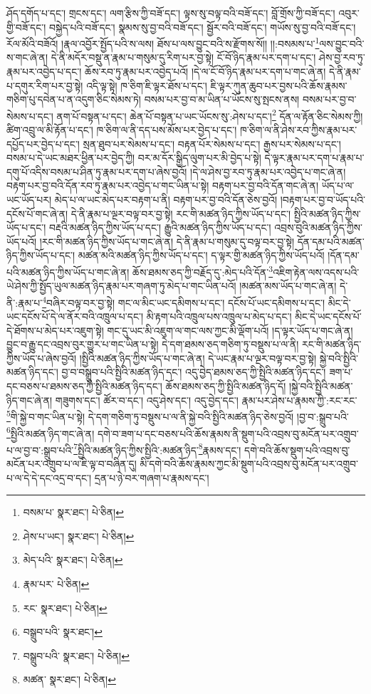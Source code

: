 ཤོད་དགོད་པ་དང་། གྲངས་དང་། ལག་རྩིས་ཀྱི་བཟོ་དང་། ལྟས་སུ་བལྟ་བའི་བཟོ་དང་། བློ་གྲོས་ཀྱི་བཟོ་དང་། འབུར་གྱི་བཟོ་དང་། བསྐྱེད་པའི་བཟོ་དང་། སྣམས་སུ་བྱ་བའི་བཟོ་དང་། སྦྱོར་བའི་བཟོ་དང་། གཡོས་སུ་བྱ་བའི་བཟོ་དང་། རོལ་མོའི་བཟོའོ། །རྣལ་འབྱོར་སྤྱོད་པའི་ས་ལས། ཐོས་པ་ལས་བྱུང་བའི་ས་རྫོགས་སོ།། །།:བསམས་པ་\footnote{བསམ་པ་  སྣར་ཐང་།  པེ་ཅིན། }ལས་བྱུང་བའི་ས་གང་ཞེ་ན། དེ་ནི་མདོར་བསྡུ་ན་རྣམ་པ་གསུམ་དུ་རིག་པར་བྱ་སྟེ། ངོ་བོ་ཉིད་རྣམ་པར་དག་པ་དང་། ཤེས་བྱ་རབ་ཏུ་རྣམ་པར་འབྱེད་པ་དང་། ཆོས་རབ་ཏུ་རྣམ་པར་འབྱེད་པའོ། །དེ་ལ་ངོ་བོ་ཉིད་རྣམ་པར་དག་པ་གང་ཞེ་ན། དེ་ནི་རྣམ་པ་དགུར་རིག་པར་བྱ་སྟེ། འདི་ལྟ་སྟེ། ཁ་ཅིག་ཇི་ལྟར་ཐོས་པ་དང་། ཇི་ལྟར་ཀུན་ཆུབ་པར་བྱས་པའི་ཆོས་རྣམས་གཅིག་པུ་དབེན་པ་ན་འདུག་ཅིང་སེམས་ཏེ། བསམ་པར་བྱ་བ་མ་ཡིན་པ་ཡོངས་སུ་སྤངས་ནས། བསམ་པར་བྱ་བ་སེམས་པ་དང་། ནག་པོ་བསྟན་པ་དང་། ཆེན་པོ་བསྟན་པ་ཡང་ཡོངས་སུ་:ཤེས་པ་དང་།\footnote{ཤེས་པ་ཡང་།  སྣར་ཐང་།  པེ་ཅིན། } དོན་ལ་རྟོན་ཅིང་སེམས་ཀྱི། ཚིག་འབྲུ་ལ་མི་རྟོན་པ་དང་། ཁ་ཅིག་ལ་ནི་དད་པས་མོས་པར་བྱེད་པ་དང་། ཁ་ཅིག་ལ་ནི་ཤེས་རབ་ཀྱིས་རྣམ་པར་དཔྱོད་པར་བྱེད་པ་དང་། སྲན་ཐུབ་པར་སེམས་པ་དང་། བརྟན་པོར་སེམས་པ་དང་། རྒྱས་པར་སེམས་པ་དང་། བསམ་པ་དེ་ཡང་མཐར་ཕྱིན་པར་བྱེད་ཀྱི། བར་མ་དོར་སྒྱིད་ལུག་པར་མི་བྱེད་པ་སྟེ། དེ་ལྟར་རྣམ་པར་དག་པ་རྣམ་པ་དགུ་པོ་འདིས་བསམ་པ་ཤིན་ཏུ་རྣམ་པར་དག་པ་ཞེས་བྱའོ། །དེ་ལ་ཤེས་བྱ་རབ་ཏུ་རྣམ་པར་འབྱེད་པ་གང་ཞེ་ན། བརྟག་པར་བྱ་བའི་དོན་རབ་ཏུ་རྣམ་པར་འབྱེད་པ་གང་ཡིན་པ་སྟེ། བརྟག་པར་བྱ་བའི་དོན་གང་ཞེ་ན། ཡོད་པ་ལ་ཡང་ཡོད་པར། མེད་པ་ལ་ཡང་མེད་པར་བརྟག་པ་ནི། བརྟག་པར་བྱ་བའི་དོན་ཅེས་བྱའོ། །བརྟག་པར་བྱ་བ་ཡོད་པའི་དངོས་པོ་གང་ཞེ་ན། དེ་ནི་རྣམ་པ་ལྔར་བལྟ་བར་བྱ་སྟེ། རང་གི་མཚན་ཉིད་ཀྱིས་ཡོད་པ་དང་། སྤྱིའི་མཚན་ཉིད་ཀྱིས་ཡོད་པ་དང་། བརྡའི་མཚན་ཉིད་ཀྱིས་ཡོད་པ་དང་། རྒྱུའི་མཚན་ཉིད་ཀྱིས་ཡོད་པ་དང་། འབྲས་བུའི་མཚན་ཉིད་ཀྱིས་ཡོད་པའོ། །རང་གི་མཚན་ཉིད་ཀྱིས་ཡོད་པ་གང་ཞེ་ན། དེ་ནི་རྣམ་པ་གསུམ་དུ་བལྟ་བར་བྱ་སྟེ། དོན་དམ་པའི་མཚན་ཉིད་ཀྱིས་ཡོད་པ་དང་། མཚན་མའི་མཚན་ཉིད་ཀྱིས་ཡོད་པ་དང་། ད་ལྟར་གྱི་མཚན་ཉིད་ཀྱིས་ཡོད་པའོ། །དོན་དམ་པའི་མཚན་ཉིད་ཀྱིས་ཡོད་པ་གང་ཞེ་ན། ཆོས་ཐམས་ཅད་ཀྱི་བརྗོད་དུ་:མེད་པའི་དོན་\footnote{མེད་པའི་  སྣར་ཐང་།  པེ་ཅིན། }འཇིག་རྟེན་ལས་འདས་པའི་ཡེ་ཤེས་ཀྱི་སྤྱོད་ཡུལ་མཚན་ཉིད་རྣམ་པར་གཞག་ཏུ་མེད་པ་གང་ཡིན་པའོ། །མཚན་མས་ཡོད་པ་གང་ཞེ་ན། དེ་ནི་:རྣམ་པ་\footnote{རྣམ་པར་  པེ་ཅིན། }བཞིར་བལྟ་བར་བྱ་སྟེ། གང་ལ་མིང་ཡང་དམིགས་པ་དང་། དངོས་པོ་ཡང་དམིགས་པ་དང་། མིང་དེ་ཡང་དངོས་པོ་དེ་ལ་ནོར་བའི་འཁྲུལ་པ་དང་། མི་རྟག་པའི་འཁྲུལ་པས་འཁྲུལ་པ་མེད་པ་དང་། མིང་དེ་ཡང་དངོས་པོ་དེ་ཐོགས་པ་མེད་པར་འཇུག་སྟེ། གང་དུ་ཡང་མི་འཇུག་ལ་གང་ལས་ཀྱང་མི་ལྡོག་པའོ། །ད་ལྟར་ཡོད་པ་གང་ཞེ་ན། བྱུང་བ་རྒྱུ་དང་འབྲས་བུར་གྱུར་པ་གང་ཡིན་པ་སྟེ། དེ་དག་ཐམས་ཅད་གཅིག་ཏུ་བསྡུས་པ་ལ་ནི། རང་གི་མཚན་ཉིད་ཀྱིས་ཡོད་པ་ཞེས་བྱའོ། །སྤྱིའི་མཚན་ཉིད་ཀྱིས་ཡོད་པ་གང་ཞེ་ན། དེ་ཡང་རྣམ་པ་ལྔར་བལྟ་བར་བྱ་སྟེ། སྐྱེ་བའི་སྤྱིའི་མཚན་ཉིད་དང་། བྱ་བ་བསྒྲུབ་པའི་སྤྱིའི་མཚན་ཉིད་དང་། འདུ་བྱེད་ཐམས་ཅད་ཀྱི་སྤྱིའི་མཚན་ཉིད་དང་། ཟག་པ་དང་བཅས་པ་ཐམས་ཅད་ཀྱི་སྤྱིའི་མཚན་ཉིད་དང་། ཆོས་ཐམས་ཅད་ཀྱི་སྤྱིའི་མཚན་ཉིད་དོ། །སྐྱེ་བའི་སྤྱིའི་མཚན་ཉིད་གང་ཞེ་ན། གཟུགས་དང་། ཚོར་བ་དང་། འདུ་ཤེས་དང་། འདུ་བྱེད་དང་། རྣམ་པར་ཤེས་པ་རྣམས་ཀྱི་:རང་རང་\footnote{རང་  སྣར་ཐང་།  པེ་ཅིན། }གི་སྐྱེ་བ་གང་ཡིན་པ་སྟེ། དེ་དག་གཅིག་ཏུ་བསྡུས་པ་ལ་ནི་སྐྱེ་བའི་སྤྱིའི་མཚན་ཉིད་ཅེས་བྱའོ། །བྱ་བ་:སྒྲུབ་པའི་\footnote{བསྒྲུབ་པའི་  སྣར་ཐང་། }སྤྱིའི་མཚན་ཉིད་གང་ཞེ་ན། དགེ་བ་ཟག་པ་དང་བཅས་པའི་ཆོས་རྣམས་ནི་སྡུག་པའི་འབྲས་བུ་མངོན་པར་འགྲུབ་པ་ལ་བྱ་བ་:སྒྲུབ་པའི་\footnote{བསྒྲུབ་པའི་  སྣར་ཐང་།  པེ་ཅིན། }སྤྱིའི་མཚན་ཉིད་ཀྱིས་སྤྱིའི་:མཚན་ཉིད་\footnote{མཚན་  སྣར་ཐང་།  པེ་ཅིན། }རྣམས་དང་། དགེ་བའི་ཆོས་སྡུག་པའི་འབྲས་བུ་མངོན་པར་འགྲུབ་པ་ལ་ཇི་ལྟ་བ་བཞིན་དུ། མི་དགེ་བའི་ཆོས་རྣམས་ཀྱང་མི་སྡུག་པའི་འབྲས་བུ་མངོན་པར་འགྲུབ་པ་ལ་དེ་དེ་དང་འདྲ་བ་དང་། དྲན་པ་ཉེ་བར་གཞག་པ་རྣམས་དང་། 